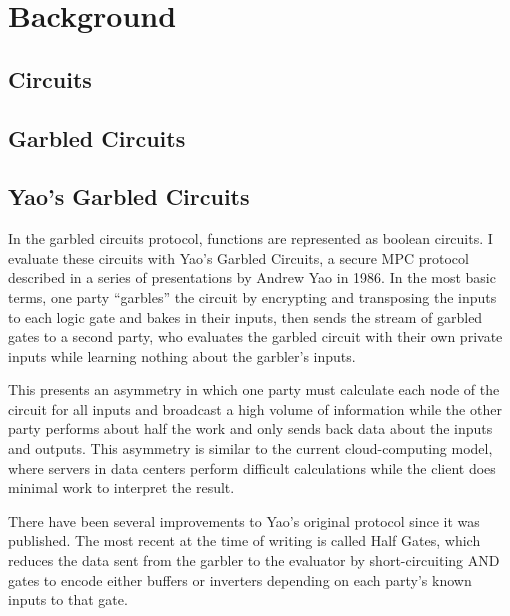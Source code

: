 \section{Background}

\subsection{Circuits}

\subsection{Garbled Circuits}

\subsection{Yao's Garbled Circuits}
In the garbled circuits protocol, functions are represented as boolean circuits. I evaluate these circuits with Yao's Garbled Circuits, a secure MPC protocol described in a series of presentations by Andrew Yao in 1986\cite{YaoGC}. In the most basic terms, one party ``garbles'' the circuit by encrypting and transposing the inputs to each logic gate and bakes in their inputs, then sends the stream of garbled gates to a second party, who evaluates the garbled circuit with their own private inputs while learning nothing about the garbler's inputs.

This presents an asymmetry in which one party must calculate each node of the circuit for all inputs and broadcast a high volume of information while the other party performs about half the work and only sends back data about the inputs and outputs. This asymmetry is similar to the current cloud-computing model, where servers in data centers perform difficult calculations while the client does minimal work to interpret the result.

There have been several improvements to Yao's original protocol since it was published. The most recent at the time of writing is called Half Gates\cite{HalfGates}, which reduces the data sent from the garbler to the evaluator by short-circuiting AND gates to encode either buffers or inverters depending on each party's known inputs to that gate.
